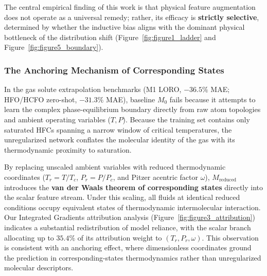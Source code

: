 The central empirical finding of this work is that physical feature augmentation does not operate as a universal remedy; rather, its efficacy is \textbf{strictly selective}, determined by whether the inductive bias aligns with the dominant physical bottleneck of the distribution shift (Figure~\ref{fig:figure1_ladder} and Figure~\ref{fig:figure5_boundary}).

\subsubsection{The Anchoring Mechanism of Corresponding States}
In the gas solute extrapolation benchmarks (M1 LORO, $-36.5\%$ MAE; HFO/HCFO zero-shot, $-31.3\%$ MAE), baseline $M_0$ fails because it attempts to learn the complex phase-equilibrium boundary directly from raw atom topologies and ambient operating variables ($T, P$). Because the training set contains only saturated HFCs spanning a narrow window of critical temperatures, the unregularized network conflates the molecular identity of the gas with its thermodynamic proximity to saturation.

By replacing unscaled ambient variables with reduced thermodynamic coordinates ($T_r = T/T_c$, $P_r = P/P_c$, and Pitzer acentric factor $\omega$), $M_{\mathrm{reduced}}$ introduces the \textbf{van der Waals theorem of corresponding states} directly into the scalar feature stream. Under this scaling, all fluids at identical reduced conditions occupy equivalent states of thermodynamic intermolecular interaction. Our Integrated Gradients attribution analysis (Figure~\ref{fig:figure3_attribution}) indicates a substantial redistribution of model reliance, with the scalar branch allocating up to $35.4\%$ of its attribution weight to $(T_r, P_r, \omega)$. This observation is consistent with an anchoring effect, where dimensionless coordinates ground the prediction in corresponding-states thermodynamics rather than unregularized molecular descriptors.

